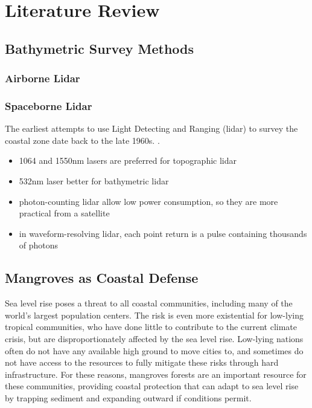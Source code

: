 \chapter{Literature Review}


\section{Bathymetric Survey Methods}

\subsection[]{Airborne Lidar}
\subsection{Spaceborne Lidar}

The earliest attempts to use Light Detecting and Ranging (lidar) to survey the coastal zone date back to the late 1960s. \parencite{Bailly2016}.

\begin{itemize}
      \item 1064 and 1550nm lasers are preferred for topographic lidar
      \item 532nm laser better for bathymetric lidar
      \item photon-counting lidar allow low power consumption, so they are more practical from a satellite
      \item in waveform-resolving lidar, each point return is a pulse containing thousands of photons
\end{itemize}

\section{Mangroves as Coastal Defense}

Sea level rise poses a threat to all coastal communities, including many of the world's largest population centers. The risk is even more existential for low-lying tropical communities, who have done little to contribute to the current climate crisis, but are disproportionately affected by the sea level rise. Low-lying nations often do not have any available high ground to move cities to, and sometimes do not have access to the resources to fully mitigate these risks through hard infrastructure. For these reasons, mangroves forests are an important resource for these communities, providing coastal protection that can adapt to sea level rise by trapping sediment and expanding outward if conditions permit.

